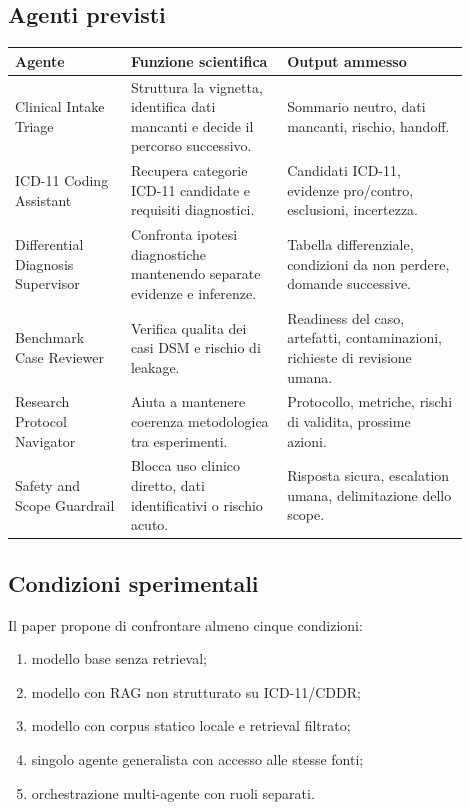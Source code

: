 \documentclass[11pt,a4paper]{article}
\begin{document}
\subsection{Agenti previsti}
\begin{longtable}{p{0.23\linewidth}p{0.31\linewidth}p{0.36\linewidth}}
\toprule
\textbf{Agente} & \textbf{Funzione scientifica} & \textbf{Output ammesso}\\
\midrule
Clinical Intake Triage & Struttura la vignetta, identifica dati mancanti e decide il percorso successivo. & Sommario neutro, dati mancanti, rischio, handoff.\\
ICD-11 Coding Assistant & Recupera categorie ICD-11 candidate e requisiti diagnostici. & Candidati ICD-11, evidenze pro/contro, esclusioni, incertezza.\\
Differential Diagnosis Supervisor & Confronta ipotesi diagnostiche mantenendo separate evidenze e inferenze. & Tabella differenziale, condizioni da non perdere, domande successive.\\
Benchmark Case Reviewer & Verifica qualita dei casi DSM e rischio di leakage. & Readiness del caso, artefatti, contaminazioni, richieste di revisione umana.\\
Research Protocol Navigator & Aiuta a mantenere coerenza metodologica tra esperimenti. & Protocollo, metriche, rischi di validita, prossime azioni.\\
Safety and Scope Guardrail & Blocca uso clinico diretto, dati identificativi o rischio acuto. & Risposta sicura, escalation umana, delimitazione dello scope.\\
\bottomrule
\end{longtable}

\subsection{Condizioni sperimentali}
Il paper propone di confrontare almeno cinque condizioni:
\begin{enumerate}
  \item modello base senza retrieval;
  \item modello con RAG non strutturato su ICD-11/CDDR;
  \item modello con corpus statico locale e retrieval filtrato;
  \item singolo agente generalista con accesso alle stesse fonti;
  \item orchestrazione multi-agente con ruoli separati.
\end{enumerate}
\end{document}
